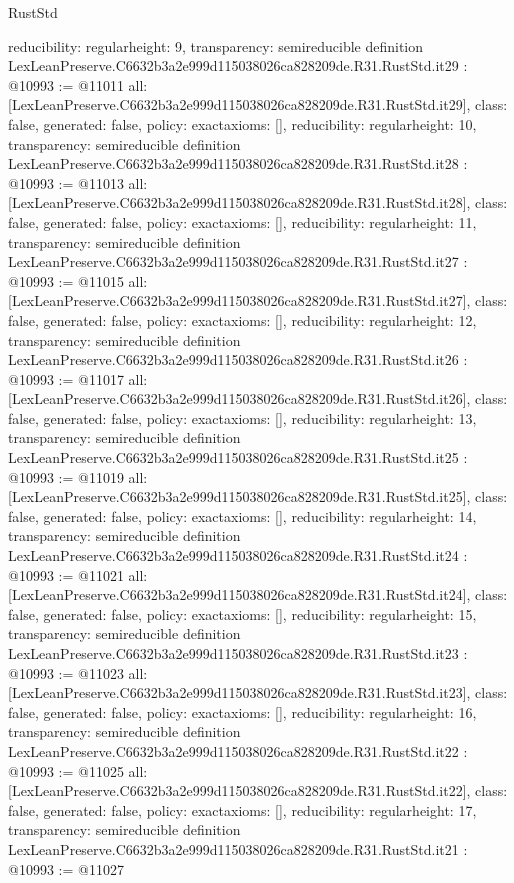 \begin{lexlean}{RustStd}
\begin{coremodule}
{  reducibility: regular{height: 9},
  transparency: semireducible
}
definition LexLeanPreserve.C6632b3a2e999d115038026ca828209de.R31.RustStd.it29 : @10993 := @11011 {
  all: [LexLeanPreserve.C6632b3a2e999d115038026ca828209de.R31.RustStd.it29],
  class: false,
  generated: false,
  policy: exact{axioms: []},
  reducibility: regular{height: 10},
  transparency: semireducible
}
definition LexLeanPreserve.C6632b3a2e999d115038026ca828209de.R31.RustStd.it28 : @10993 := @11013 {
  all: [LexLeanPreserve.C6632b3a2e999d115038026ca828209de.R31.RustStd.it28],
  class: false,
  generated: false,
  policy: exact{axioms: []},
  reducibility: regular{height: 11},
  transparency: semireducible
}
definition LexLeanPreserve.C6632b3a2e999d115038026ca828209de.R31.RustStd.it27 : @10993 := @11015 {
  all: [LexLeanPreserve.C6632b3a2e999d115038026ca828209de.R31.RustStd.it27],
  class: false,
  generated: false,
  policy: exact{axioms: []},
  reducibility: regular{height: 12},
  transparency: semireducible
}
definition LexLeanPreserve.C6632b3a2e999d115038026ca828209de.R31.RustStd.it26 : @10993 := @11017 {
  all: [LexLeanPreserve.C6632b3a2e999d115038026ca828209de.R31.RustStd.it26],
  class: false,
  generated: false,
  policy: exact{axioms: []},
  reducibility: regular{height: 13},
  transparency: semireducible
}
definition LexLeanPreserve.C6632b3a2e999d115038026ca828209de.R31.RustStd.it25 : @10993 := @11019 {
  all: [LexLeanPreserve.C6632b3a2e999d115038026ca828209de.R31.RustStd.it25],
  class: false,
  generated: false,
  policy: exact{axioms: []},
  reducibility: regular{height: 14},
  transparency: semireducible
}
definition LexLeanPreserve.C6632b3a2e999d115038026ca828209de.R31.RustStd.it24 : @10993 := @11021 {
  all: [LexLeanPreserve.C6632b3a2e999d115038026ca828209de.R31.RustStd.it24],
  class: false,
  generated: false,
  policy: exact{axioms: []},
  reducibility: regular{height: 15},
  transparency: semireducible
}
definition LexLeanPreserve.C6632b3a2e999d115038026ca828209de.R31.RustStd.it23 : @10993 := @11023 {
  all: [LexLeanPreserve.C6632b3a2e999d115038026ca828209de.R31.RustStd.it23],
  class: false,
  generated: false,
  policy: exact{axioms: []},
  reducibility: regular{height: 16},
  transparency: semireducible
}
definition LexLeanPreserve.C6632b3a2e999d115038026ca828209de.R31.RustStd.it22 : @10993 := @11025 {
  all: [LexLeanPreserve.C6632b3a2e999d115038026ca828209de.R31.RustStd.it22],
  class: false,
  generated: false,
  policy: exact{axioms: []},
  reducibility: regular{height: 17},
  transparency: semireducible
}
definition LexLeanPreserve.C6632b3a2e999d115038026ca828209de.R31.RustStd.it21 : @10993 := @11027 {
}
\end{coremodule}
\end{lexlean}
